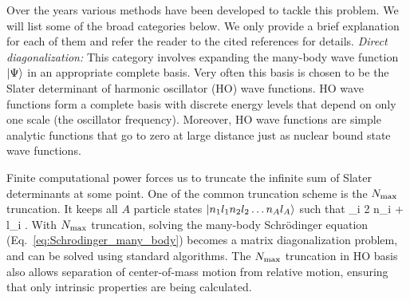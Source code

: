 	Over the years various methods have been developed to tackle
  this problem.  We will list some of the broad categories below.
	We only provide
  a brief explanation for each of them and refer the reader to the cited
  references for details.
	\bi
	\li
	\emph{Direct diagonalization:}
	This category involves expanding the many-body wave function ${|\Psi\rangle}$ in
	an appropriate complete basis.  Very often this basis is chosen to be the
	Slater determinant of harmonic oscillator (HO) wave functions.
	HO wave functions form a complete basis with discrete energy levels that
	depend on only one scale (the oscillator frequency).  Moreover, HO
	wave functions are simple analytic functions that go to zero at large
	distance just as nuclear bound state wave functions.

	Finite computational power forces us to truncate the infinite sum of
	Slater determinants at some point.  One of the common truncation scheme is
	the ${N_{\mathrm{max}}}$ truncation.  It keeps all $A$ particle states
	${|n_1 l_1 n_2 l_2 \ldots n_A l_A\rangle}$ such that
	\beq
	\sum_i 2 n_i + l_i \leq \Nmax \;.
	\eeq
	With ${N_{\mathrm{max}}}$ truncation, solving the many-body Schr\"{o}dinger equation
	(Eq.~\eqref{eq:Schrodinger_many_body}) becomes a matrix diagonalization
	problem, and can be solved using standard algorithms. The ${N_{\mathrm{max}}}$
	truncation in HO basis also allows
	separation of center-of-mass motion from relative motion, ensuring that only
	intrinsic properties are being calculated.


